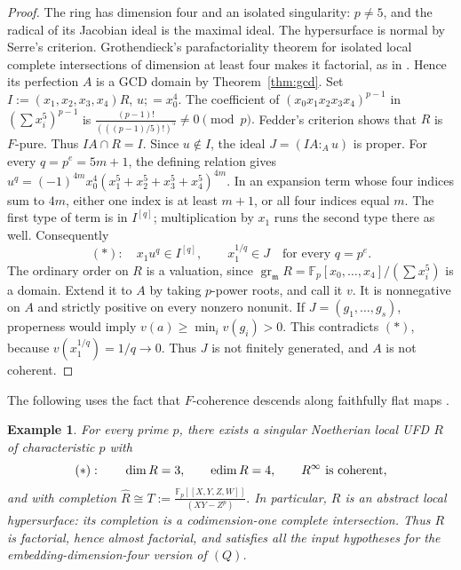 \documentclass[11pt,a4paper]{amsart}
\numberwithin{equation}{section}
\newtheorem{example}[theorem]{Example}\newtheorem{notation}[theorem]{Notation}
\newcommand{\FF}{\mathbb F}
\begin{document}
\begin{proof}
The ring has dimension four and an isolated singularity:
$p\neq5$, and the radical of its Jacobian ideal is the maximal ideal.
The hypersurface is normal by Serre's criterion.
Grothendieck's parafactoriality theorem for isolated local complete
	intersections of dimension at least four makes it factorial, as
in \cite[Example~2.6]{Simpson}.
Hence its perfection $A$ is a GCD domain by
Theorem~\ref{thm:gcd}.
Set 	$ I:=(x_1,x_2,x_3,x_4)R$,  $u;=x_0^4.$
The coefficient of $(x_0x_1x_2x_3x_4)^{p-1}$ in
$(\sum x_i^5)^{p-1}$ is
$	\frac{(p-1)!}{(((p-1)/5)!)^5}\neq0\pmod p.	$
Fedder's criterion \cite{Fedder} shows that $R$ is $F$-pure.
Thus $IA\cap R=I$.
Since $u\notin I$, the ideal
 $J=(IA:_A u) $
is proper.
For every $q=p^e=5m+1$, the defining relation gives	$ u^q=(-1)^{4m}x_0^4(x_1^5+x_2^5+x_3^5+x_4^5)^{4m}. $
In an expansion term whose four indices sum to $4m$, either
one index is at least $m+1$, or all four indices equal $m$.
The first type of term is in $I^{[q]}$; multiplication by $x_1$
runs the second type there as well.
 Consequently
$$(\ast):\quad	x_1u^q\in I^{[q]},
 \qquad x_1^{1/q}\in J
\quad\text{for every }q=p^e.$$
The ordinary order on $R$ is a valuation, since
 	$	\operatorname{gr}_{\mathfrak m}R
 	=\FF_p[x_0,\ldots,x_4]/(\textstyle\sum x_i^5) $	is a domain. Extend it to $A$ by taking $p$-power roots,
 	and call it $v$.
It is nonnegative on $A$ and strictly positive on every nonzero
nonunit. If $J=(g_1,\ldots,g_s)$, properness would imply
$	v(a)\geq\min_i v(g_i)>0$.
This contradicts  $(\ast)$, because $v(x_1^{1/q})=1/q\to0$.
Thus $J$ is not finitely generated, and $A$ is not coherent.
 \end{proof}
 
The following uses the fact that $F$-coherence descends along
 faithfully flat maps \cite[Section~3]{Shim}.
 
 \begin{example}\label{thm:candidate}
 	For every prime $p$, there exists a singular Noetherian local
 	UFD $R$ of characteristic $p$ with
 	$$
 (\ast):\quad	\quad\dim R=3,\qquad \operatorname{edim} R=4,\qquad R^\infty\text{ is coherent},	$$
 	and with completion
 $\widehat R\cong
T:=\frac{\FF_p[[X,Y,Z,W]]}{(XY-Z^p)}. $
In particular, $R$ is an abstract local hypersurface: its
completion is a codimension-one complete intersection.
Thus $R$ is factorial, hence almost factorial, and satisfies
all the input hypotheses for the embedding-dimension-four
version of $(Q)$.
 \end{example}
 
\end{document}
